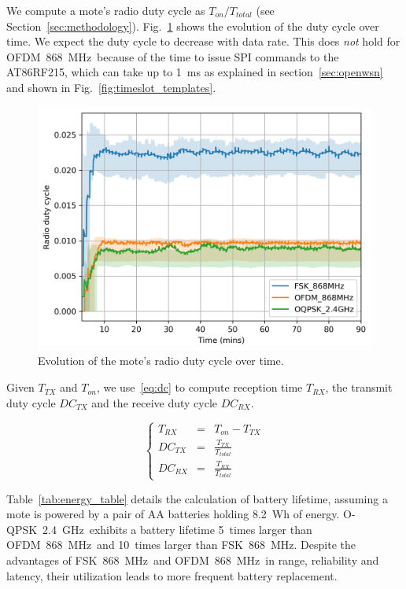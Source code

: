 \documentclass[sensors,article,submit,moreauthors,pdftex]{Definitions/mdpi}
\newcommand{\fsk}           {FSK~868~MHz}
\newcommand{\oqpsk}         {O-QPSK~2.4~GHz}
\newcommand{\ofdm}          {OFDM~868~MHz}
\newcommand{\figwidth}      {0.80}
\begin{document}

We compute a mote's radio duty cycle as $T_{on}/T_{total}$ (see Section~\ref{sec:methodology}).
Fig.~\ref{fig:dutyCycle_time} shows the evolution of the duty cycle over time.
We expect the duty cycle to decrease with data rate.
This does \textit{not} hold for \ofdm\ because of the time to issue SPI commands to the AT86RF215, which can take up to 1~ms as explained in section~\ref{sec:openwsn} and shown in Fig.~\ref{fig:timeslot_templates}.

\begin{figure}
	\centering
	\includegraphics[width=\figwidth\columnwidth]{dutyCycle_time}
	\caption{
	    Evolution of the mote's radio duty cycle over time.
	}
    \label{fig:dutyCycle_time}
\end{figure}

Given $T_{TX}$ and $T_{on}$, we use~\eqref{eq:dc} to compute reception time $T_{RX}$, the transmit duty cycle $DC_{TX}$ and the receive duty cycle $DC_{RX}$.

\begin{equation}
    \left\{
        \begin{array}{lcl}
            T_{RX}  & = & T_{on}-T_{TX}            \\
            DC_{TX} & = & \frac{T_{TX}}{T_{total}} \\
            DC_{RX} & = & \frac{T_{RX}}{T_{total}}
        \end{array}
    \right.
    \label{eq:dc}
\end{equation}

Table~\ref{tab:energy_table} details the calculation of battery lifetime, assuming a mote is powered by a pair of AA batteries holding 8.2~Wh of energy.
\oqpsk\ exhibits a battery lifetime
      5~times larger than \ofdm\ and
     10~times larger than \fsk.
Despite the advantages of \fsk\ and \ofdm\ in range, reliability and latency, their utilization leads to more frequent battery replacement.
\end{document}
